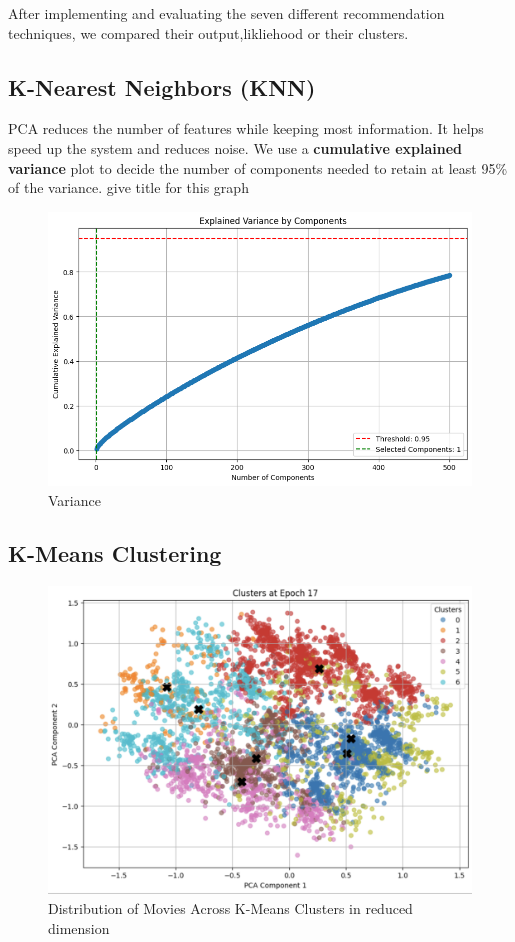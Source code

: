 \documentclass[a4paper]{article}
\theoremstyle{plain}
\begin{document}
After implementing and evaluating the seven different recommendation techniques, we compared their output,likliehood or their clusters.

\subsection{K-Nearest Neighbors (KNN)}
PCA reduces the number of features while keeping most information. It helps speed up the system and reduces noise. We use a \textbf{cumulative explained variance} plot to decide the number of components needed to retain at least 95\% of the variance. give title for this graph
  \begin{figure}[H]
      \centering
      \includegraphics[width=\linewidth]{variance.png}
      \caption{Variance}
      \label{fig:enter-label}
  \end{figure}

\subsection{K-Means Clustering}
    \begin{figure}[H]
        \centering
        \includegraphics[width=\linewidth]{clustering2.png}
        \caption{Distribution of Movies Across K-Means Clusters in reduced dimension}
        \label{fig:cluster_dist}
    \end{figure}
\end{document}
